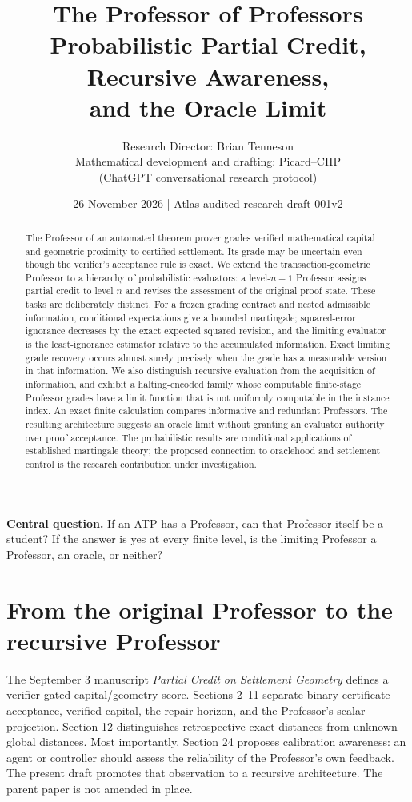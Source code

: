 \documentclass[11pt,letterpaper]{article}
\title{\bfseries The Professor of Professors\\[4pt]\large Probabilistic Partial Credit, Recursive Awareness,\\and the Oracle Limit}
\author{Research Director: Brian Tenneson\\\small Mathematical development and drafting: Picard--CIIP\\\small (ChatGPT conversational research protocol)}
\date{26 November 2026 \quad | \quad Atlas-audited research draft 001v2}
\theoremstyle{definition}\newtheorem{definition}[theorem]{Definition}\newtheorem{example}[theorem]{Example}\newtheorem{conjecture}[theorem]{Conjecture}
\begin{document}
\maketitle
\begin{abstract}
The Professor of an automated theorem prover grades verified mathematical capital and geometric proximity to certified settlement. Its grade may be uncertain even though the verifier's acceptance rule is exact. We extend the transaction-geometric Professor to a hierarchy of probabilistic evaluators: a level-$n+1$ Professor assigns partial credit to level $n$ and revises the assessment of the original proof state. These tasks are deliberately distinct. For a frozen grading contract and nested admissible information, conditional expectations give a bounded martingale; squared-error ignorance decreases by the exact expected squared revision, and the limiting evaluator is the least-ignorance estimator relative to the accumulated information. Exact limiting grade recovery occurs almost surely precisely when the grade has a measurable version in that information. We also distinguish recursive evaluation from the acquisition of information, and exhibit a halting-encoded family whose computable finite-stage Professor grades have a limit function that is not uniformly computable in the instance index. An exact finite calculation compares informative and redundant Professors. The resulting architecture suggests an oracle limit without granting an evaluator authority over proof acceptance. The probabilistic results are conditional applications of established martingale theory; the proposed connection to oraclehood and settlement control is the research contribution under investigation.
\end{abstract}
\textbf{Central question.} If an ATP has a Professor, can that Professor itself be a student? If the answer is yes at every finite level, is the limiting Professor a Professor, an oracle, or neither?
\setcounter{tocdepth}{1}
\begingroup
\small
\makeatletter
\renewcommand*\l@section{\@dottedtocline{1}{0em}{1.5em}}
\makeatother
\tableofcontents
\endgroup
\clearpage
\section{From the original Professor to the recursive Professor}
The September 3 manuscript \emph{Partial Credit on Settlement Geometry} \cite{partial} defines a verifier-gated capital/geometry score. Sections 2--11 separate binary certificate acceptance, verified capital, the repair horizon, and the Professor's scalar projection. Section 12 distinguishes retrospective exact distances from unknown global distances. Most importantly, Section 24 proposes calibration awareness: an agent or controller should assess the reliability of the Professor's own feedback. The present draft promotes that observation to a recursive architecture. The parent paper is not amended in place.
\end{document}
